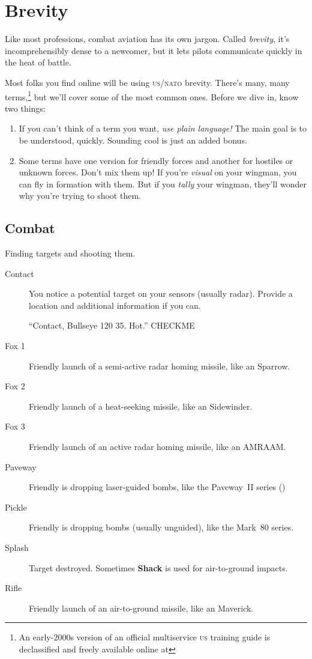 \chapter{Brevity}

Like most professions, combat aviation has its own jargon.
Called \emph{brevity}, it's incomprehensibly dense to a newcomer,
but it lets pilots communicate quickly in the heat of battle.

Most folks you find online will be using \textsc{us/nato} brevity.
There's many,
many terms,\punckern\footnote{An early-2000s version of an official
multiservice \textsc{us} training guide is declassified and freely available
online at }
but we'll cover some of the most common ones.
Before we dive in, know two things:
\begin{enumerate}
\item If you can't think of a term you want,
    \emph{use plain language!}
    The main goal is to be understood, quickly.
    Sounding cool is just an added bonus.
\item Some terms have one version for friendly forces
    and another for hostiles or unknown forces.
    Don't mix them up!
    If you're \emph{visual} on your wingman,
    you can fly in formation with them.
    But if you \emph{tally} your wingman,
    they'll wonder why you're trying to shoot them.
\end{enumerate}

\section{Combat}

Finding targets and shooting them.
\begin{description}
\item[Contact] You notice a potential target on your sensors (usually radar).
    Provide a location and additional information if you can.

    ``Contact, Bullseye 120 35. Hot.'' CHECKME

\item[Fox 1] Friendly launch of a semi-active radar homing 
    missile, like an  Sparrow.
\item[Fox 2] Friendly launch of a heat-seeking missile, like an
     Sidewinder.
\item[Fox 3] Friendly launch of an active radar homing  missile,
    like an  AMRAAM.

\item[Paveway] Friendly is dropping laser-guided bombs,
    like the Paveway~II series ()

\item[Pickle] Friendly is dropping bombs (usually unguided),
    like the Mark~80 series.

\item[Splash] Target destroyed. Sometimes \textbf{Shack} is used for
    air-to-ground impacts.

\item[Rifle] Friendly launch of an air-to-ground missile,
    like an  Maverick.
\end{description}
